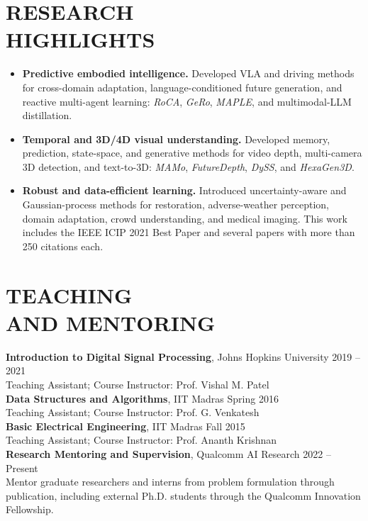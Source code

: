 \documentclass[margin,11pt]{resume}
\begin{document}
\section{\footnotesize {\large R}ESEARCH\\ {\large H}IGHLIGHTS}
\begin{itemize}[leftmargin=*,itemsep=2pt,topsep=2pt]
    \item \textbf{Predictive embodied intelligence.} Developed VLA and driving methods for cross-domain adaptation, language-conditioned future generation, and reactive multi-agent learning: \textit{RoCA}, \textit{GeRo}, \textit{MAPLE}, and multimodal-LLM distillation.
    \item \textbf{Temporal and 3D/4D visual understanding.} Developed memory, prediction, state-space, and generative methods for video depth, multi-camera 3D detection, and text-to-3D: \textit{MAMo}, \textit{FutureDepth}, \textit{DySS}, and \textit{HexaGen3D}.
    \item \textbf{Robust and data-efficient learning.} Introduced uncertainty-aware and Gaussian-process methods for restoration, adverse-weather perception, domain adaptation, crowd understanding, and medical imaging. This work includes the IEEE ICIP 2021 Best Paper and several papers with more than 250 citations each.
\end{itemize}

\vspace{-0.8em}
\section{\footnotesize {\large T}EACHING\\ {\large A}ND {\large M}ENTORING}
{\bf Introduction to Digital Signal Processing}, Johns Hopkins University \hfill 2019 -- 2021\\
Teaching Assistant; Course Instructor: Prof. Vishal M. Patel\\
{\bf Data Structures and Algorithms}, IIT Madras \hfill Spring 2016\\
Teaching Assistant; Course Instructor: Prof. G. Venkatesh\\
{\bf Basic Electrical Engineering}, IIT Madras \hfill Fall 2015\\
Teaching Assistant; Course Instructor: Prof. Ananth Krishnan\\
{\bf Research Mentoring and Supervision}, Qualcomm AI Research \hfill 2022 -- Present\\
Mentor graduate researchers and interns from problem formulation through publication, including external Ph.D. students through the Qualcomm Innovation Fellowship.
\end{document}
